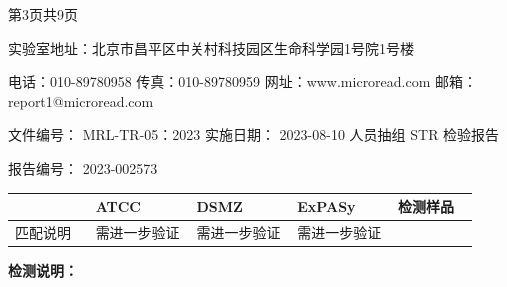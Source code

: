 \documentclass[UTF8,10pt,a4paper,fontset=fandol]{ctexart}
\newcommand{\fieldvalue}[1]{#1}
\begin{document}
\vfill

\begin{center}
第3页共9页

实验室地址：北京市昌平区中关村科技园区生命科学园1号院1号楼

电话：010-89780958 传真：010-89780959 网址：www.microread.com 邮箱：report1@microread.com
\end{center}


\newpage

\begin{center}
\small
文件编号：
\fieldvalue{MRL-TR-05：2023}
\hspace{2cm}
实施日期：
\fieldvalue{2023-08-10}
\hspace{2cm}
人员抽组 STR 检验报告

报告编号：
\fieldvalue{2023-002573}

\vspace{0.5em}

\begin{tabular}{p{0.16\linewidth}p{0.20\linewidth}p{0.20\linewidth}p{0.20\linewidth}p{0.16\linewidth}}
\hline
 & ATCC & DSMZ & ExPASy & 检测样品 \\
\hline
匹配说明 &
\fieldvalue{需进一步验证} &
\fieldvalue{需进一步验证} &
\fieldvalue{需进一步验证} &
\\
\hline
\end{tabular}
\end{center}

\vspace{1em}

\textbf{检测说明：}
\end{document}
